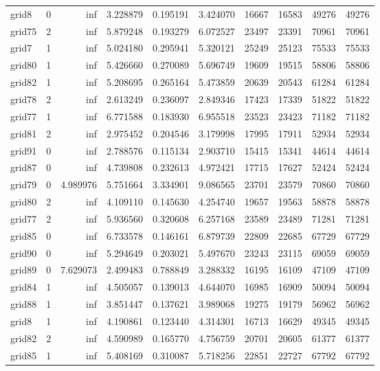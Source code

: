 \begin{longtable}{|l|r|r|r|r|r|r|r|r|r|}
grid8 & 0 & inf & 3.228879 & 0.195191 & 3.424070 & 16667 & 16583 & 49276 & 49276 \\
grid75 & 2 & inf & 5.879248 & 0.193279 & 6.072527 & 23497 & 23391 & 70961 & 70961 \\
grid7 & 1 & inf & 5.024180 & 0.295941 & 5.320121 & 25249 & 25123 & 75533 & 75533 \\
grid80 & 1 & inf & 5.426660 & 0.270089 & 5.696749 & 19609 & 19515 & 58806 & 58806 \\
grid82 & 1 & inf & 5.208695 & 0.265164 & 5.473859 & 20639 & 20543 & 61284 & 61284 \\
grid78 & 2 & inf & 2.613249 & 0.236097 & 2.849346 & 17423 & 17339 & 51822 & 51822 \\
grid77 & 1 & inf & 6.771588 & 0.183930 & 6.955518 & 23523 & 23423 & 71182 & 71182 \\
grid81 & 2 & inf & 2.975452 & 0.204546 & 3.179998 & 17995 & 17911 & 52934 & 52934 \\
grid91 & 0 & inf & 2.788576 & 0.115134 & 2.903710 & 15415 & 15341 & 44614 & 44614 \\
grid87 & 0 & inf & 4.739808 & 0.232613 & 4.972421 & 17715 & 17627 & 52424 & 52424 \\
grid79 & 0 & 4.989976 & 5.751664 & 3.334901 & 9.086565 & 23701 & 23579 & 70860 & 70860 \\
grid80 & 2 & inf & 4.109110 & 0.145630 & 4.254740 & 19657 & 19563 & 58878 & 58878 \\
grid77 & 2 & inf & 5.936560 & 0.320608 & 6.257168 & 23589 & 23489 & 71281 & 71281 \\
grid85 & 0 & inf & 6.733578 & 0.146161 & 6.879739 & 22809 & 22685 & 67729 & 67729 \\
grid90 & 0 & inf & 5.294649 & 0.203021 & 5.497670 & 23243 & 23115 & 69059 & 69059 \\
grid89 & 0 & 7.629073 & 2.499483 & 0.788849 & 3.288332 & 16195 & 16109 & 47109 & 47109 \\
grid84 & 1 & inf & 4.505057 & 0.139013 & 4.644070 & 16985 & 16909 & 50094 & 50094 \\
grid88 & 1 & inf & 3.851447 & 0.137621 & 3.989068 & 19275 & 19179 & 56962 & 56962 \\
grid8 & 1 & inf & 4.190861 & 0.123440 & 4.314301 & 16713 & 16629 & 49345 & 49345 \\
grid82 & 2 & inf & 4.590989 & 0.165770 & 4.756759 & 20701 & 20605 & 61377 & 61377 \\
grid85 & 1 & inf & 5.408169 & 0.310087 & 5.718256 & 22851 & 22727 & 67792 & 67792 \\

\end{longtable}
